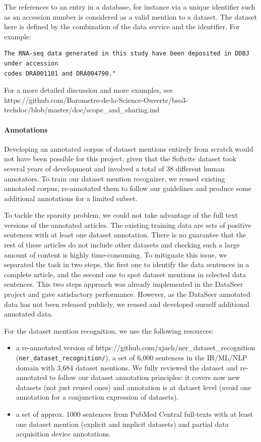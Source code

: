 \documentclass[
]{article}
\begin{document}
The references to an entry in a database, for instance via a unique
identifier such as an accession number is considered as a valid mention
to a dataset. The dataset here is defined by the combination of the data
service and the identifier. For example:

\begin{verbatim}
The RNA-seq data generated in this study have been deposited in DDBJ under accession 
codes DRA001101 and DRA004790."
\end{verbatim}

For a more detailed discussion and more examples, see
https://github.com/Barometre-de-la-Science-Ouverte/bso3-techdoc/blob/master/doc/scope\_and\_sharing.md

\hypertarget{annotations-1}{%
\paragraph{Annotations}\label{annotations-1}}

Developing an annotated corpus of dataset mentions entirely from scratch
would not have been possible for this project, given that the Softcite
dataset took several years of development and involved a total of 38
different human annotators. To train our dataset mention recognizer, we
reused existing annotated corpus, re-annotated them to follow our
guidelines and produce some additional annotations for a limited subset.

To tackle the sparsity problem, we could not take advantage of the full
text versions of the annotated articles. The existing training data are
sets of positive sentences with at least one dataset annotation. There
is no guarantee that the rest of these articles do not include other
datasets and checking such a large amount of content is highly
time-consuming. To mitiguate this issue, we separated the task in two
steps, the first one to identify the data sentences in a complete
article, and the second one to spot dataset mentions in selected data
sentences. This two steps approach was already implemented in the
DataSeer project and gave satisfactory performance. However, as the
DataSeer annotated data has not been released publicly, we reused and
developed ourself additional annotated data.

For the dataset mention recognition, we use the following resources:

\begin{itemize}
\item
  a re-annotated version of
  https://github.com/xjaeh/ner\_dataset\_recognition
  (\texttt{ner\_dataset\_recognition/}), a set of 6,000 sentences in the
  IR/ML/NLP domain with 3,684 dataset mentions. We fully reviewed the
  dataset and re-annotated to follow our dataset annotation principles:
  it covers now new datasets (not just reused ones) and annotation is at
  dataset level (avoid one annotation for a conjunction expression of
  datasets).
\item
  a set of approx. 1000 sentences from PubMed Central full-texts with at
  least one dataset mention (explicit and implicit datasets) and partial
  data acquisition device annotations.
\end{itemize}
\end{document}
